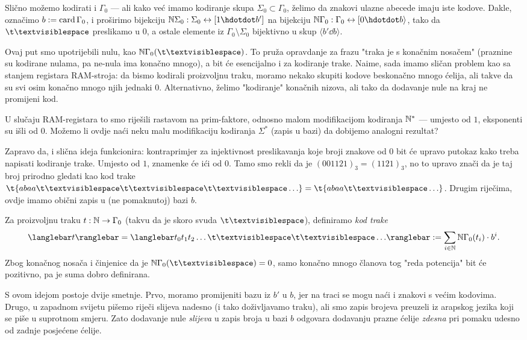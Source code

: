 Slično možemo kodirati i $\Gamma_0$ --- ali kako već imamo kodiranje skupa $\Sigma_0\subset\Gamma_0$, želimo da znakovi ulazne abecede imaju iste kodove. Dakle, označimo $b:=\operatorname{card}\Gamma_0$, i proširimo bijekciju $\N\Sigma_0:\Sigma_0\leftrightarrow[1\dd b']$ na bijekciju $\N\Gamma_0:\Gamma_0\leftrightarrow[0\dd b\rangle$, tako da $\bl$ preslikamo u $0$, a ostale elemente iz $\Gamma_0\!\setminus\Sigma_0$ bijektivno u skup $\langle b'\dd b\rangle$.

Ovaj put smo upotrijebili nulu, kao $\N\Gamma_0(\bl)$. To pruža opravdanje za frazu "traka je s konačnim nosačem" (praznine su kodirane nulama, pa ne-nula ima konačno mnogo), a bit će esencijalno i za kodiranje trake. Naime, sada imamo sličan problem kao sa stanjem registara RAM-stroja: da bismo kodirali proizvoljnu traku, moramo nekako skupiti kodove beskonačno mnogo ćelija, ali takve da su svi osim konačno mnogo njih jednaki $0$. Alternativno, želimo "kodiranje" konačnih nizova, ali tako da dodavanje nule na kraj ne promijeni kod.

U slučaju RAM-registara to smo riješili rastavom na prim-faktore, odnosno malom modifikacijom kodiranja ${\mathbb N}^*$ --- umjesto od $1$, eksponenti su išli od $0$. Možemo li ovdje naći neku malu modifikaciju kodiranja $\Sigma^*$ (zapis u bazi) da dobijemo analogni rezultat?

Zapravo da, i slična ideja funkcionira: kontraprimjer za injektivnost preslikavanja koje broji znakove od $0$ bit će upravo putokaz kako treba napisati kodiranje trake. Umjesto od $1$, znamenke će ići od $0$. Tamo smo rekli da je $(001121)_3=(1121)_3$, no to upravo znači da je taj broj prirodno gledati kao kod trake $\t{abaa\bl\bl\bl\ldots}=\t{abaa\bl\ldots}$. Drugim riječima, ovdje imamo obični zapis u (ne pomaknutoj) bazi $b$.

\begin{definicija}[{name=[kodiranje trake Turingovog stroja]}]
Za proizvoljnu traku $t:{\mathbb N}\to\Gamma_0$ (takvu da je skoro svuda $\bl$), definiramo \emph{kod trake} \begin{equation}
    \knk{t}=\knk{t_0t_1t_2\ldots\bl\bl\ldots}:=\sum_{i\in\N}\N\Gamma_0(t_i)\cdot b^i\text.
\end{equation}
Zbog konačnog nosača i činjenice da je $\N\Gamma_0(\bl)=0$, samo konačno mnogo članova tog "reda potencija" bit će pozitivno, pa je suma dobro definirana.
\end{definicija}

S ovom idejom postoje dvije smetnje. Prvo, moramo promijeniti bazu iz $b'$ u $b$, jer na traci se mogu naći i znakovi s većim kodovima. Drugo, u zapadnom svijetu pišemo riječi slijeva nadesno (i tako doživljavamo traku), ali smo zapis brojeva preuzeli iz arapskog jezika koji se piše u suprotnom smjeru. Zato dodavanje nule \emph{slijeva} u zapis broja u bazi $b$ odgovara dodavanju prazne ćelije \emph{zdesna} pri pomaku udesno od zadnje posjećene ćelije.

